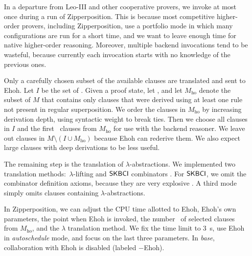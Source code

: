 \documentclass[smallcondensed,draft]{svjour3}     %
\begin{document}
In a departure from Leo-III and other cooperative provers,
%
we invoke  at most once during a run of Zipperposition.
This is because most competitive higher-order provers, including Zipperposition, use a portfolio
mode in which many configurations are run for a short time, and we want to
leave enough time for native higher-order reasoning. Moreover, multiple
backend invocations tend to be wasteful, because currently each invocation
starts with no knowledge of the previous ones.

Only a carefully chosen subset of the available clauses are translated and sent
to Ehoh. Let $I$ be the set of . Given a proof state, let , and let $M_\mathrm{ho}$ denote
the subset of $M$ that contains only clauses that were derived using at least
one \lsup{} rule not present in regular superposition. We order the clauses in
$M_\mathrm{ho}$ by increasing derivation depth, using syntactic weight to break
ties. Then we choose all clauses in $I$ and the first \ParamNumClauses~clauses from
$M_\mathrm{ho}$ for use with the backend reasoner.
We leave out clauses in $M \setminus (I \cup M_\mathrm{ho})$ because Ehoh can rederive them.
We also expect large clauses with deep derivations to be less useful.

The remaining step is the translation of $\lambda$-abstractions. We implemented two
translation methods:\ $\lambda$-lifting \cite{tj-1985-lambdalift} and
$\mathsf{SKBCI}$ combinators \cite{da-1979-combtrans}. For
$\mathsf{SKBCI}$, we omit the combinator definition axioms, because they are
very explosive \cite{br-20-full-sup-w-combs}. A third mode simply omits clauses
containing $\lambda$-abstractions.


  In Zipperposition, we can adjust the CPU time allotted to Ehoh, Ehoh's own
  parameters, the point when Ehoh is invoked, the number \ParamNumClauses~of selected clauses from
  $M_\mathrm{ho}$, and the $\lambda$ translation method. We fix the time
  limit to 3~s, use Ehoh in \emph{autoschedule} mode, and focus on the last three
  parameters. In \emph{base}, collaboration with Ehoh is
  disabled (labeled $-$Ehoh).
\end{document}
